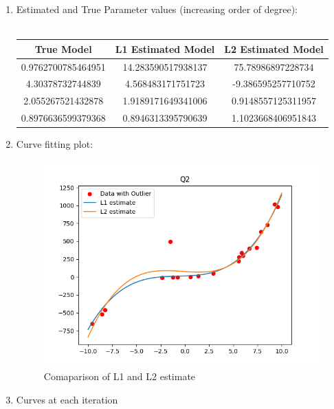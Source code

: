 \documentclass{article}
\begin{document}
\begin{enumerate}
    \item Estimated and True Parameter values (increasing order of degree):\\\\
    \begin{tabular}{|c|c|c|} 
        \hline 
       True Model & L1 Estimated Model & L2 Estimated Model\\ 
       \hline 
       0.9762700785464951 & 14.283590517938137 & 75.78986897228734\\ 
       \hline 
       4.30378732744839 & 4.568483171751723 & -9.386595257710752\\ 
       \hline 
       2.055267521432878 & 1.9189171649341006 & 0.9148557125311957\\ 
       \hline 
       0.8976636599379368 & 0.8946313395790639 & 1.1023668406951843\\ 
       \hline 
       \end{tabular}
\clearpage
       \item Curve fitting plot:
       \begin{figure}[h]
            \centering
            \includegraphics[width = 15 cm]{figs/Q2plots.png}
        \caption{Comaparison of L1 and L2 estimate}
    \end{figure}
\clearpage
        \item Curves at each iteration
        \begin{figure}[h]
            \centering

\end{figure}
\end{enumerate}
\end{document}
